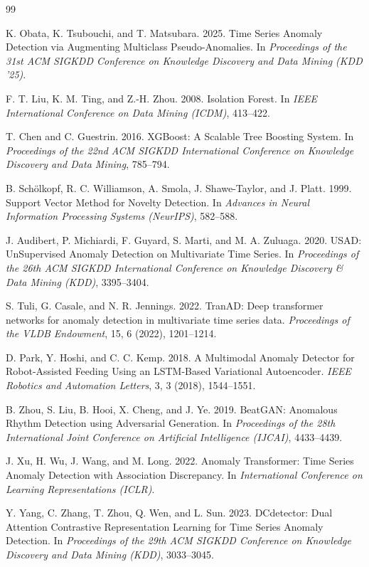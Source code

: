 \documentclass[sigconf,nonacm]{acmart}
\begin{document}
\begin{thebibliography}{99}
\small

K. Obata, K. Tsubouchi, and T. Matsubara. 2025.
Time Series Anomaly Detection via Augmenting Multiclass Pseudo-Anomalies.
In \textit{Proceedings of the 31st ACM SIGKDD Conference on Knowledge Discovery and Data Mining (KDD '25)}.

F. T. Liu, K. M. Ting, and Z.-H. Zhou. 2008.
Isolation Forest.
In \textit{IEEE International Conference on Data Mining (ICDM)}, 413--422.

T. Chen and C. Guestrin. 2016.
XGBoost: A Scalable Tree Boosting System.
In \textit{Proceedings of the 22nd ACM SIGKDD International Conference on Knowledge Discovery and Data Mining}, 785--794.

B. Schölkopf, R. C. Williamson, A. Smola, J. Shawe-Taylor, and J. Platt. 1999.
Support Vector Method for Novelty Detection.
In \textit{Advances in Neural Information Processing Systems (NeurIPS)}, 582--588.

J. Audibert, P. Michiardi, F. Guyard, S. Marti, and M. A. Zuluaga. 2020.
USAD: UnSupervised Anomaly Detection on Multivariate Time Series.
In \textit{Proceedings of the 26th ACM SIGKDD International Conference on Knowledge Discovery \& Data Mining (KDD)}, 3395--3404.

S. Tuli, G. Casale, and N. R. Jennings. 2022.
TranAD: Deep transformer networks for anomaly detection in multivariate time series data.
\textit{Proceedings of the VLDB Endowment}, 15, 6 (2022), 1201--1214.

D. Park, Y. Hoshi, and C. C. Kemp. 2018.
A Multimodal Anomaly Detector for Robot-Assisted Feeding Using an LSTM-Based Variational Autoencoder.
\textit{IEEE Robotics and Automation Letters}, 3, 3 (2018), 1544--1551.

B. Zhou, S. Liu, B. Hooi, X. Cheng, and J. Ye. 2019.
BeatGAN: Anomalous Rhythm Detection using Adversarial Generation.
In \textit{Proceedings of the 28th International Joint Conference on Artificial Intelligence (IJCAI)}, 4433--4439.

J. Xu, H. Wu, J. Wang, and M. Long. 2022.
Anomaly Transformer: Time Series Anomaly Detection with Association Discrepancy.
In \textit{International Conference on Learning Representations (ICLR)}.

Y. Yang, C. Zhang, T. Zhou, Q. Wen, and L. Sun. 2023.
DCdetector: Dual Attention Contrastive Representation Learning for Time Series Anomaly Detection.
In \textit{Proceedings of the 29th ACM SIGKDD Conference on Knowledge Discovery and Data Mining (KDD)}, 3033--3045.


\end{thebibliography}
\end{document}
